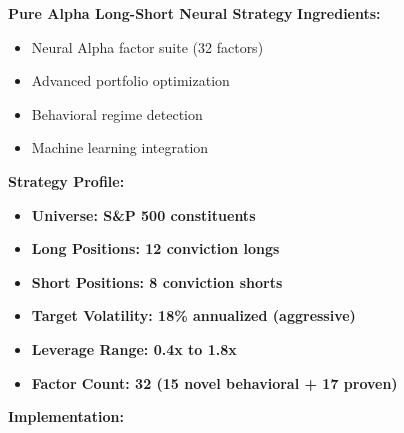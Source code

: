 \documentclass[11pt,letterpaper,openany]{book}
\begin{document}
\textbf{Pure Alpha Long-Short Neural Strategy}
\textbf{Ingredients:}
\begin{itemize}
    \item Neural Alpha factor suite (32 factors)
    \item Advanced portfolio optimization
    \item Behavioral regime detection
    \item Machine learning integration
\end{itemize}
\textbf{Strategy Profile:}
\begin{itemize}
    \item \textbf{Universe: S\&P 500 constituents}
    \item \textbf{Long Positions: 12 conviction longs}
    \item \textbf{Short Positions: 8 conviction shorts}
    \item \textbf{Target Volatility: 18\% annualized (aggressive)}
    \item \textbf{Leverage Range: 0.4x to 1.8x}
    \item \textbf{Factor Count: 32 (15 novel behavioral + 17 proven)}
\end{itemize}
\textbf{Implementation:}
\end{document}
